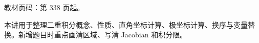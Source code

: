 
\begin{knowledgeBox}
教材页码：第 338 页起。

本讲用于整理二重积分概念、性质、直角坐标计算、极坐标计算、换序与变量替换。新增题目时重点画清区域、写清 Jacobian 和积分限。
\end{knowledgeBox}
